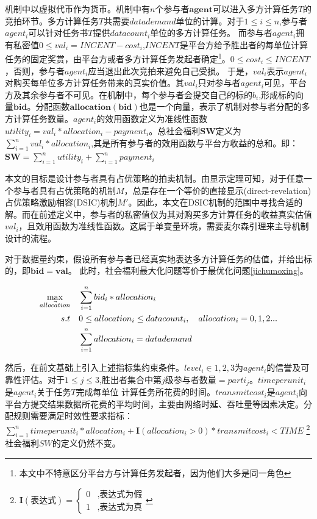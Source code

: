 \documentclass[promaster]{thesis-uestc}
\begin{document}
机制中以虚拟代币作为货币。机制中有$n$个参与者$\mathbf{agent}$可以进入多方计算任务$T$的竞拍环节。多方计算任务$T$共需要$datademand$单位的计算。对于$1\leq i\leq n$,参与者$agent_i$可以针对任务书$T$提供$datacount_i$单位的多方计算任务。
而参与者$agent_i$拥有私密值$0 \leq val_i = INCENT-cost_i$,$INCENT$是平台方给予胜出者的每单位计算任务的固定奖赏，由平台方或者多方计算任务发起者确定\footnote{本文中不特意区分平台方与计算任务发起者，因为他们大多是同一角色}。$0 \leq cost_i \leq INCENT$，否则，参与者$agent_i$应当退出此次竞拍来避免自己受损。 于是，$val_i$表示$agent_i$对购买每单位多方计算任务带来的真实价值。其$val_i$只对参与者$agent_i$可见，平台方及其余参与者不可见。在机制中，每个参与者会提交自己的标的$b_i$,形成标的向量$\mathbf{bid}$。分配函数$\mathbf{allocation}(\mathbf{bid})$也是一个向量，表示了机制对参与者分配的多方计算任务数量。$agent_i$的效用函数定义为准线性函数$utility_i = val_i*allocation_i-payment_i$。总社会福利$\mathbf{SW}$定义为$\sum_{i=1}^n{val_i*allocation_i}$,其是所有参与者的效用函数与平台方收益的总和。即：$\mathbf{SW} = \sum_{i=1}^n{utility_i}+\sum_{i=1}^{n}{payment_i}$

本文的目标是设计参与者具有占优策略的拍卖机制。由显示定理可知，对于任意一个参与者具有占优策略的机制$M$，总是存在一个等价的直接显示(direct-revelation)占优策略激励相容(DSIC)机制$M'$。因此，本文在DSIC机制的范围中寻找合适的解。而在前述定义中，参与者的私密值仅为其对购买多方计算任务的收益真实估值$val_i$，且效用函数为准线性函数。这属于单变量环境，需要麦尔森引理来主导机制设计的流程。

对于数据量约束，假设所有参与者已经真实地表达多方计算任务的估值，并给出标的，即$\mathbf{bid} = \mathbf{val}$。 此时，社会福利最大化问题等价于最优化问题\ref{jichumoxing}。

\begin{align}
    \label{jichumoxing}\max_{\vec{allocation}} \quad&\sum_{i=1}^{n}{bid_i*allocation_i}\\
    s.t                     \quad& 0\leq allocation_i\leq datacount_i,\quad allocation_i = {0,1,2...}\notag\\
                            \quad& \sum_{i=1}^{n}{allocation_i} = datademand\notag 
\end{align}


然后，在前文基础上引入上述指标集约束条件。$level_i\in {1,2,3}$为$agent_i$的信誉及可靠性评估。对于$1\leq j \leq 3$,胜出者集合中第$j$级参与者数量$=parti_j$。$timeperunit_i$是$agent_i$关于$任务T$完成每单位
计算任务所花费的时间。$transmitcost_i$是$agent_i$向平台方提交结果数据所花费的平均时间，主要由网络时延、吞吐量等因素决定。分配规则需要满足时效性要求指标：$\sum_{i=1}^{n}{timeperunit_i*allocation_i+\mathbf{I}(allocation_i > 0)*transmitcost_i} < TIME$
\footnote{$\mathbf{I}(\text{表达式}) = \begin{cases}{}
        0&,\text{表达式为假}\\
        1&,\text{表达式为真}
        \end{cases}$
}%
社会福利$SW$的定义仍然不变。
\end{document}
